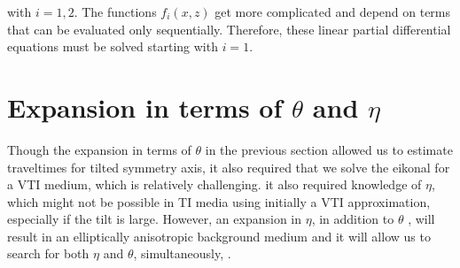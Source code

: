 with $i=1,2$. The functions $f_i(x,z)$ get more complicated   and depend on terms that can be evaluated 
only sequentially. Therefore, these linear partial differential equations must be solved   starting with $i=1$. 

\section{Expansion in terms of $\theta$ and $\eta$}

Though the expansion in terms of $\theta$ in the previous section allowed us to estimate traveltimes for   tilted symmetry axis, it also required 
that we solve the eikonal  for a VTI medium, which
is relatively challenging.  it also required knowledge of $\eta$, which might not be possible
in TI media using initially a VTI approximation, especially if the tilt is large.
 However, an expansion in $\eta$, in addition to $\theta$ , 
 will result in an elliptically anisotropic background medium  and it will allow us to search for both $\eta$ and $\theta$, simultaneously, .
 
